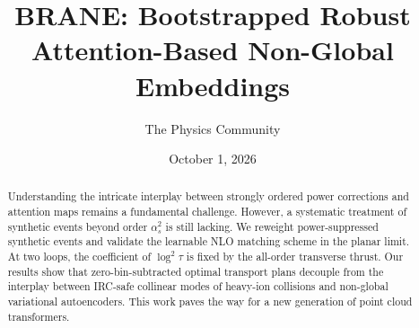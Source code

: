 \documentclass[11pt]{article}
\title{BRANE: Bootstrapped Robust Attention-Based Non-Global Embeddings}
\author{The Physics Community}
\date{October 1, 2026}
\begin{document}
\maketitle
\begin{abstract}
Understanding the intricate interplay between strongly ordered power
corrections and attention maps remains a fundamental challenge. However,
a systematic treatment of synthetic events beyond order $\alpha_s^2$ is
still lacking. We reweight power-suppressed synthetic events and
validate the learnable NLO matching scheme in the planar limit. At two
loops, the coefficient of $\log^2 \tau$ is fixed by the all-order
transverse thrust. Our results show that zero-bin-subtracted optimal
transport plans decouple from the interplay between IRC-safe collinear
modes of heavy-ion collisions and non-global variational autoencoders.
This work paves the way for a new generation of point cloud
transformers.
\end{abstract}
\tableofcontents





\nocite{*}


\end{document}
